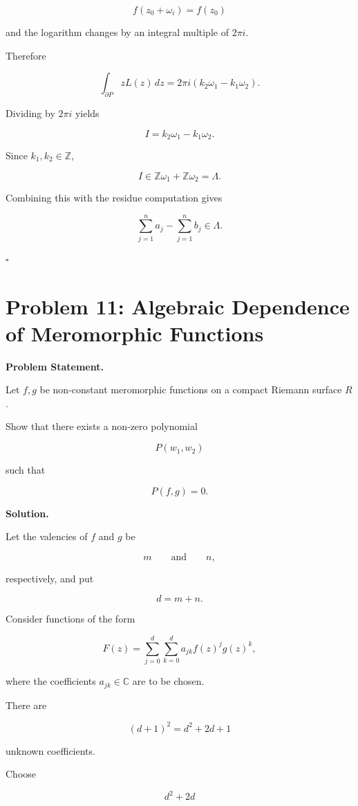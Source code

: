 \documentclass[12pt,a4paper]{article}
\theoremstyle{notespace}
\begin{document}
\[
f(z_0+\omega_i)=f(z_0)
\]

and the logarithm changes by an integral multiple of \(2\pi i\).

Therefore

\[
\int_{\partial P}
zL(z)\,dz
=
2\pi i
\left(
k_2\omega_1-k_1\omega_2
\right).
\]

Dividing by \(2\pi i\) yields

\[
I
=
k_2\omega_1-k_1\omega_2.
\]

Since \(k_1,k_2\in\mathbb Z\),

\[
I\in
\mathbb Z\omega_1+\mathbb Z\omega_2
=
\Lambda.
\]

Combining this with the residue computation gives

\[
\boxed{
	\sum_{j=1}^{n}a_j
	-
	\sum_{j=1}^{n}b_j
	\in \Lambda.
}
\]

\hfill\(\square\)

\newpage

\section{Problem 11: Algebraic Dependence of Meromorphic Functions}

\textbf{Problem Statement.}

Let \(f,g\) be non-constant meromorphic functions on a compact Riemann surface \(R\).

Show that there exists a non-zero polynomial

\[
P(w_1,w_2)
\]

such that

\[
P(f,g)=0.
\]

\bigskip

\textbf{Solution.}

Let the valencies of \(f\) and \(g\) be

\[
m
\qquad\text{and}\qquad
n,
\]

respectively, and put

\[
d=m+n.
\]

Consider functions of the form

\[
F(z)
=
\sum_{j=0}^{d}
\sum_{k=0}^{d}
a_{jk}
f(z)^j g(z)^k,
\]

where the coefficients \(a_{jk}\in\mathbb C\) are to be chosen.

There are

\[
(d+1)^2
=
d^2+2d+1
\]

unknown coefficients.

Choose

\[
d^2+2d
\]
\end{document}
